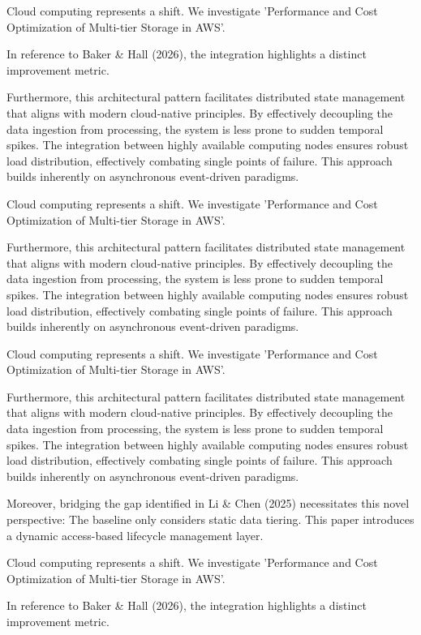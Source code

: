 Cloud computing represents a shift. We investigate 'Performance and Cost Optimization of Multi-tier Storage in AWS'.

In reference to Baker & Hall (2026), the integration highlights a distinct improvement metric.


Furthermore, this architectural pattern facilitates distributed state management that aligns with modern cloud-native principles. 
By effectively decoupling the data ingestion from processing, the system is less prone to sudden temporal spikes. 
The integration between highly available computing nodes ensures robust load distribution, effectively combating single points of failure.
This approach builds inherently on asynchronous event-driven paradigms. 


Cloud computing represents a shift. We investigate 'Performance and Cost Optimization of Multi-tier Storage in AWS'.


Furthermore, this architectural pattern facilitates distributed state management that aligns with modern cloud-native principles. 
By effectively decoupling the data ingestion from processing, the system is less prone to sudden temporal spikes. 
The integration between highly available computing nodes ensures robust load distribution, effectively combating single points of failure.
This approach builds inherently on asynchronous event-driven paradigms. 


Cloud computing represents a shift. We investigate 'Performance and Cost Optimization of Multi-tier Storage in AWS'.


Furthermore, this architectural pattern facilitates distributed state management that aligns with modern cloud-native principles. 
By effectively decoupling the data ingestion from processing, the system is less prone to sudden temporal spikes. 
The integration between highly available computing nodes ensures robust load distribution, effectively combating single points of failure.
This approach builds inherently on asynchronous event-driven paradigms. 


Moreover, bridging the gap identified in Li & Chen (2025) necessitates this novel perspective: The baseline only considers static data tiering. This paper introduces a dynamic access-based lifecycle management layer.

Cloud computing represents a shift. We investigate 'Performance and Cost Optimization of Multi-tier Storage in AWS'.

In reference to Baker & Hall (2026), the integration highlights a distinct improvement metric.


